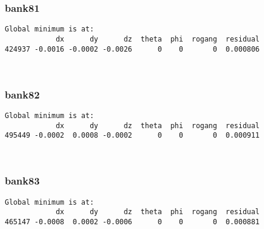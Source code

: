 \documentclass[11pt]{article}
\begin{document}
    \hypertarget{bank81}{%
\subsubsection{bank81}\label{bank81}}

    \begin{Verbatim}[commandchars=\\\{\}]
Global minimum is at:
            dx      dy      dz  theta  phi  rogang  residual
424937 -0.0016 -0.0002 -0.0026      0    0       0  0.000806
    \end{Verbatim}

    \begin{center}
    \end{center}
    { \hspace*{\fill} \\}
    
    \hypertarget{bank82}{%
\subsubsection{bank82}\label{bank82}}

    \begin{Verbatim}[commandchars=\\\{\}]
Global minimum is at:
            dx      dy      dz  theta  phi  rogang  residual
495449 -0.0002  0.0008 -0.0002      0    0       0  0.000911
    \end{Verbatim}

    \begin{center}
    \end{center}
    { \hspace*{\fill} \\}
    
    \hypertarget{bank83}{%
\subsubsection{bank83}\label{bank83}}

    \begin{Verbatim}[commandchars=\\\{\}]
Global minimum is at:
            dx      dy      dz  theta  phi  rogang  residual
465147 -0.0008  0.0002 -0.0006      0    0       0  0.000881
    \end{Verbatim}
\end{document}
